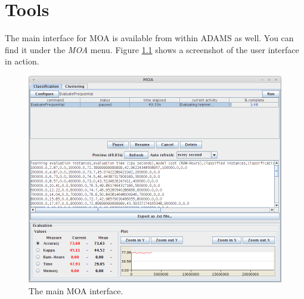 \documentclass[a4paper]{book}
\begin{document}
\chapter{Tools}
The main interface for MOA is available from within ADAMS as well. You can
find it under the \textit{MOA} menu. Figure \ref{moa-gui} shows a screenshot
of the user interface in action.
\begin{figure}[htb]
  \centering
  \includegraphics[width=12.0cm]{images/moa-gui.png}
  \caption{The main MOA interface.}
  \label{moa-gui}
\end{figure}



\end{document}
